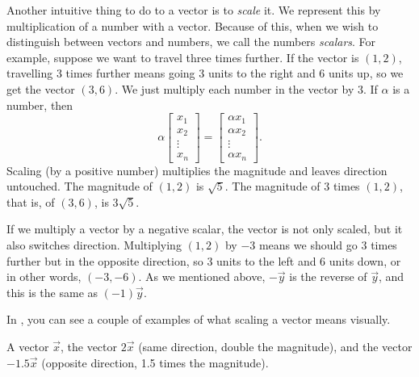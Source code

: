 Another intuitive thing to do to a vector is to
\emph{scale} it.
We represent this by multiplication of a number with a vector.
Because of this, when we wish to distinguish between vectors and numbers, we
call the numbers \emph{scalars}.
For example,
suppose we want to travel three times further.  If the vector is $(1,2)$,
travelling 3 times further means going 3 units to the right and 6 units up,
so we get the vector $(3,6)$.
We just multiply each number in the vector by 3.
If $\alpha$ is a number, then
\begin{equation*}
\alpha
\begin{bmatrix}
x_{1} \\ x_2 \\ \vdots \\ x_n
\end{bmatrix} =
\begin{bmatrix}
\alpha x_{1} \\ \alpha x_2 \\ \vdots \\ \alpha x_n
\end{bmatrix} .
\end{equation*}
Scaling (by a positive number) multiplies the magnitude
and leaves direction untouched.
The magnitude of $(1,2)$
is $\sqrt{5}$.  The magnitude of 3 times $(1,2)$, that is, of $(3,6)$, is
$3\sqrt{5}$.

If we multiply a vector by a negative scalar,
the
vector is not only scaled, but it also switches direction.
Multiplying $(1,2)$ by $-3$ means we should go 3 times further but in the
opposite direction, so 3 units to the left and 6 units down, or in other
words, $(-3,-6)$.  As we mentioned above, $-\vec{y}$ is the reverse of
$\vec{y}$, and this is the same as $(-1)\vec{y}$.

In , you can see a couple of examples of
what scaling a vector means visually.

\begin{myfig}
\capstart
{}
\caption{A vector $\vec{x}$, the vector $2\vec{x}$ (same direction,
double the magnitude), and the vector $-1.5\vec{x}$ (opposite direction,
1.5 times the magnitude).\label{linalg-vecscale:fig}}
\end{myfig}

